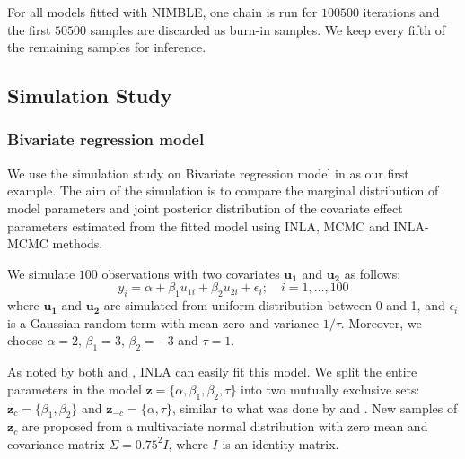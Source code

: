 \documentclass[
]{article}
\begin{document}
For all models fitted with NIMBLE, one chain is run for \(100500\)
iterations and the first \(50500\) samples are discarded as burn-in
samples. We keep every fifth of the remaining samples for inference.

\hypertarget{simulation-study}{%
\subsection{Simulation Study}\label{simulation-study}}

\hypertarget{bivariate-regression-model}{%
\subsubsection{Bivariate regression
model}\label{bivariate-regression-model}}

We use the simulation study on Bivariate regression model in
\citet{gomez2018markov} as our first example. The aim of the simulation
is to compare the marginal distribution of model parameters and joint
posterior distribution of the covariate effect parameters estimated from
the fitted model using INLA, MCMC and INLA-MCMC methods.

We simulate \(100\) observations with two covariates \(\mathbf{u_1}\)
and \(\mathbf{u_2}\) as follows:
\begin{equation}\label{bivariateRegression}
y_i = \alpha + \beta_1 u_{1i} + \beta_2 u_{2i} + \epsilon_i; \quad i = 1, \ldots, 100
\end{equation} where \(\mathbf{u_1}\) and \(\mathbf{u_2}\) are simulated
from uniform distribution between 0 and 1, and \(\epsilon_i\) is a
Gaussian random term with mean zero and variance \(1/\tau\). Moreover,
we choose \(\alpha = 2\), \(\beta_1 = 3\), \(\beta_2 = -3\) and
\(\tau=1\).

As noted by both \citet{gomez2018markov} and
\citet{berild2022importance}, INLA can easily fit this model. We split
the entire parameters in the model
\(\mathbf{z} = \{\alpha ,\beta_1, \beta_2, \tau \}\) into two mutually
exclusive sets: \(\mathbf{z}_c = \{\beta_1, \beta_2 \}\) and
\(\mathbf{z}_{-c} = \{\alpha, \tau \}\), similar to what was done by
\citet{gomez2018markov} and \citet{berild2022importance}. New samples of
\(\mathbf{z}_c\) are proposed from a multivariate normal distribution
with zero mean and covariance matrix \(\Sigma = 0.75^2 I\), where \(I\)
is an identity matrix.
\end{document}
